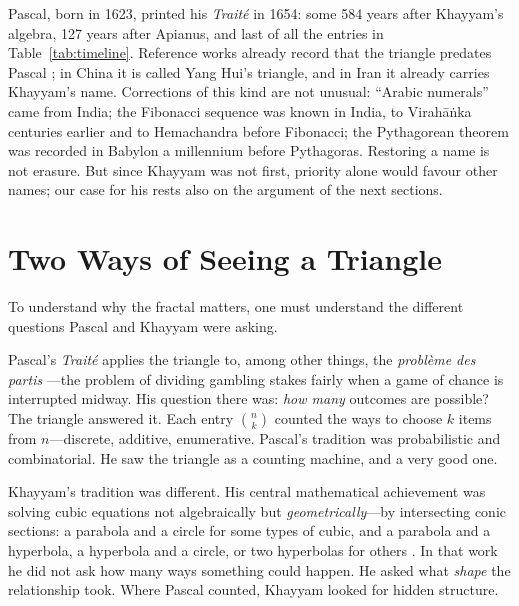 \documentclass[11pt]{amsart}
\begin{document}
Pascal, born in 1623, printed his \emph{Traité} in 1654: some 584 years after Khayyam's algebra, 127 years after Apianus, and last of all the entries in Table~\ref{tab:timeline}. Reference works already record that the triangle predates Pascal \cite{mathworld,edwards1987}; in China it is called Yang Hui's triangle, and in Iran it already carries Khayyam's name. Corrections of this kind are not unusual: ``Arabic numerals'' came from India; the Fibonacci sequence was known in India, to Virahāṅka centuries earlier and to Hemachandra before Fibonacci; the Pythagorean theorem was recorded in Babylon a millennium before Pythagoras. Restoring a name is not erasure. But since Khayyam was not first, priority alone would favour other names; our case for his rests also on the argument of the next sections.

\section{Two Ways of Seeing a Triangle}

To understand why the fractal matters, one must understand the different questions Pascal and Khayyam were asking.

Pascal's \emph{Traité} applies the triangle to, among other things, the \emph{problème des partis} \cite{pascal1654}---the problem of dividing gambling stakes fairly when a game of chance is interrupted midway. His question there was: \emph{how many} outcomes are possible? The triangle answered it. Each entry $\binom{n}{k}$ counted the ways to choose $k$ items from $n$---discrete, additive, enumerative. Pascal's tradition was probabilistic and combinatorial. He saw the triangle as a counting machine, and a very good one.

Khayyam's tradition was different. His central mathematical achievement was solving cubic equations not algebraically but \emph{geometrically}---by intersecting conic sections: a parabola and a circle for some types of cubic, and a parabola and a hyperbola, a hyperbola and a circle, or two hyperbolas for others \cite{khayyam1070,rashed2000}. In that work he did not ask how many ways something could happen. He asked what \emph{shape} the relationship took. Where Pascal counted, Khayyam looked for hidden structure.
\end{document}
